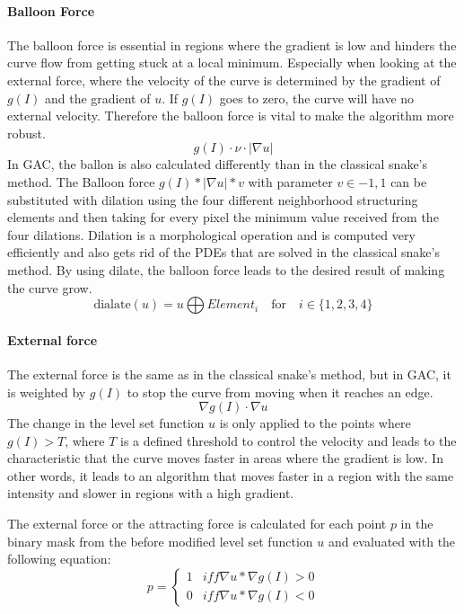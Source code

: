 \paragraph{Balloon Force}
The balloon force is essential in regions where the gradient is low and hinders the curve flow from getting stuck at a local minimum. Especially when looking at the external force, where the velocity of the curve is determined by the gradient of $g(I)$ and the gradient of $u$. If $g(I)$ goes to zero, the curve will have no external velocity. Therefore the balloon force is vital to make the algorithm more robust.
\begin{equation}
    g(I) \cdot \nu \cdot |\nabla u|
\end{equation}
In GAC, the ballon is also calculated differently than in the classical snake's method. 
The Balloon force $g(I)*|\nabla u| *v$ with parameter $v \in  {-1,1}$ can be substituted with dilation using the four different neighborhood structuring elements and then taking for every pixel the minimum value received from the four dilations. Dilation is a morphological operation and is computed very efficiently and also gets rid of the PDEs that are solved in the classical snake's method. By using dilate, the balloon force leads to the desired result of making the curve grow. 
\begin{equation}
    \text{dialate}(u)  =  u \bigoplus Element_i \quad \text{for} \quad i \in \{1,2,3,4\}
    \label{dialate}
\end{equation}

\paragraph{External force}
The external force is the same as in the classical snake's method, but in GAC, it is weighted by $g(I)$ to stop the curve from moving when it reaches an edge.
\begin{equation}
    \nabla g(I) \cdot \nabla u
\end{equation}
The change in the level set function $u$ is only applied to the points where $g(I) > T$, where $T$ is a defined threshold to control the velocity and leads to the characteristic that the curve moves faster in areas where the gradient is low. In other words, it leads to an algorithm that moves faster in a region with the same intensity and slower in regions with a high gradient. 

The external force or the attracting force is calculated for each point $p$ in the binary mask from the before modified level set function $u$ and evaluated with the following equation:
\begin{equation}
    p = \begin{cases}
        1 &iff  \nabla u * \nabla g(I) > 0 \\
        0 &iff \nabla u * \nabla g(I) < 0
    \end{cases}
    \label{eq:externalforce}
\end{equation}
